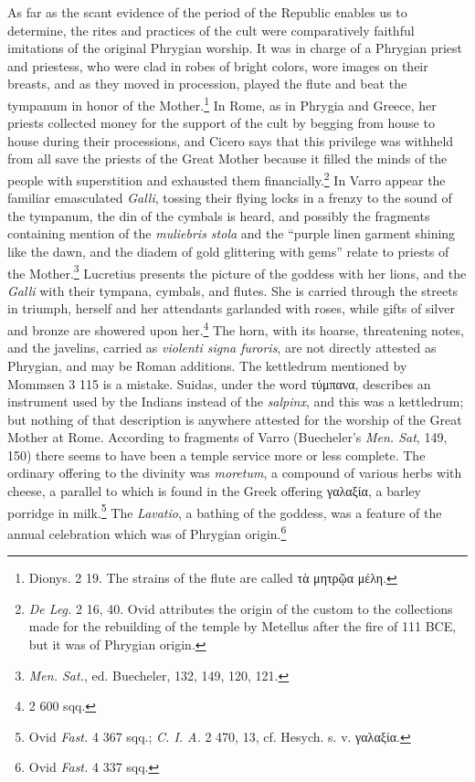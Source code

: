 \documentclass[a4paper, 11pt, oneside, polutonikogreek, french]{article}
\begin{document}
As far as the scant evidence of the period of the Republic enables us to determine, the rites and practices of the cult were comparatively faithful imitations of the original Phrygian worship. It was in charge of a Phrygian priest and priestess, who were clad in robes of bright colors, wore images on their breasts, and as they moved in procession, played the flute and beat the tympanum in honor of the Mother.\footnote{Dionys. 2 19. The strains of the flute are called τὰ μητρῷα μέλη.} In Rome, as in Phrygia and Greece, her priests collected money for the support of the cult by begging from house to house during their processions, and Cicero says that this privilege was withheld from all save the priests of the Great Mother because it filled the minds of the people with superstition and exhausted them financially.\footnote{\emph{De Leg.} 2 16, 40. Ovid attributes the origin of the custom to the collections made for the rebuilding of the temple by Metellus after the fire of 111 \textsc{BCE}, but it was of Phrygian origin.} In Varro appear the familiar emasculated \emph{Galli}, tossing their flying locks in a frenzy to the sound of the tympanum, the din of the cymbals is heard, and possibly the fragments containing mention of the \emph{muliebris stola} and the ``purple linen garment shining like the dawn, and the diadem of gold glittering with gems'' relate to priests of the Mother.\footnote{\emph{Men. Sat.}, ed. Buecheler, 132, 149, 120, 121.} Lucretius presents the picture of the goddess with her lions, and the \emph{Galli} with their tympana, cymbals, and flutes. She is carried through the streets in triumph, herself and her attendants garlanded with roses, while gifts of silver and bronze are showered upon her.\footnote{2 600 sqq.} The horn, with its hoarse, threatening notes, and the javelins, carried as \emph{violenti signa furoris}, are not directly attested as Phrygian, and may be Roman additions. The kettledrum mentioned by Mommsen 3 115 is a mistake. Suidas, under the word τύμπανα, describes an instrument used by the Indians instead of the \emph{salpinx}, and this was a kettledrum; but nothing of that description is anywhere attested for the worship of the Great Mother at Rome. According to fragments of Varro (Buecheler's \emph{Men. Sat}, 149, 150) there seems to have been a temple service more or less complete. The ordinary offering to the divinity was \emph{moretum}, a compound of various herbs with cheese, a parallel to which is found in the Greek offering γαλαξία, a barley porridge in milk.\footnote{Ovid \emph{Fast.} 4 367 sqq.; \emph{C. I. A.} 2 470, 13, cf. Hesych. s. v. γαλαξία.} The \emph{Lavatio}, a bathing of the goddess, was a feature of the annual celebration which was of Phrygian origin.\footnote{Ovid \emph{Fast.} 4 337 sqq.}
\end{document}
